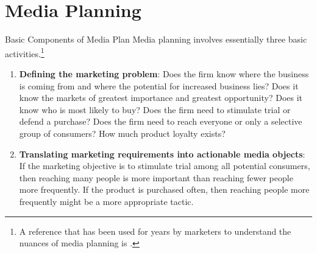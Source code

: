 \documentclass[pdf]{beamer}
\theoremstyle{remark}
\theoremstyle{definition}
\begin{document}
\section{Media Planning}

\begin{frame}[t]{Basic Components of Media Plan}
Media planning involves essentially three basic activities.\footnote{A reference that has been used for years by marketers to understand the nuances of media planning is \cite{sissors2010}.}\\
\vspace{0.0ex}
\small
\begin{enumerate}
  \item \textbf{Defining the marketing problem}:   Does the firm know where the business is coming from and where the potential for increased business lies?  Does it know the markets of greatest importance and greatest opportunity?  Does it know who is most likely to buy?  Does the firm need to stimulate trial or defend a purchase? Does the firm need to reach everyone or only a selective group of consumers? How much product loyalty exists?
  \item \textbf{Translating marketing requirements into actionable media objects}: If the marketing objective is to stimulate trial among all potential consumers, then reaching many people is more important than reaching fewer people more frequently. If the product is purchased often, then reaching people more frequently might be a more appropriate tactic.
\end{enumerate}
\end{frame}
\end{document}
